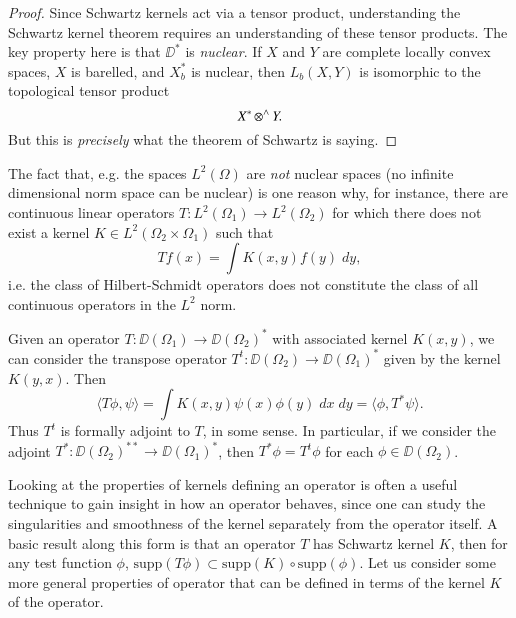 \begin{proof}
    Since Schwartz kernels act via a tensor product, understanding the Schwartz kernel theorem requires an understanding of these tensor products. The key property here is that $\DD^*$ is \emph{nuclear}. If $X$ and $Y$ are complete locally convex spaces, $X$ is barelled, and $X^*_b$ is nuclear, then $L_b(X,Y)$ is isomorphic to the topological tensor product
    \[ X^* \operatorname{{{\otimes}^\wedge}} Y. \]
    But this is \emph{precisely} what the theorem of Schwartz is saying.
\end{proof}

\begin{remark}
    The fact that, e.g. the spaces $L^2(\Omega)$ are \emph{not} nuclear spaces (no infinite dimensional norm space can be nuclear) is one reason why, for instance, there are continuous linear operators $T: L^2(\Omega_1) \to L^2(\Omega_2)$ for which there does not exist a kernel $K \in L^2(\Omega_2 \times \Omega_1)$ such that
    \[ Tf(x) = \int K(x,y) f(y)\; dy, \]
    i.e. the class of Hilbert-Schmidt operators does not constitute the class of all continuous operators in the $L^2$ norm.
\end{remark}

Given an operator $T: \DD(\Omega_1) \to \DD(\Omega_2)^*$ with associated kernel $K(x,y)$, we can consider the transpose operator $T^t: \DD(\Omega_2) \to \DD(\Omega_1)^*$ given by the kernel $K(y,x)$. Then
%
\[ \langle T\phi, \psi \rangle = \int K(x,y) \psi(x) \phi(y)\; dx\; dy = \langle \phi, T^* \psi \rangle. \]
%
Thus $T^t$ is formally adjoint to $T$, in some sense. In particular, if we consider the adjoint $T^*: \DD(\Omega_2)^{**} \to \DD(\Omega_1)^*$, then $T^* \phi = T^t \phi$ for each $\phi \in \DD(\Omega_2)$.

Looking at the properties of kernels defining an operator is often a useful technique to gain insight in how an operator behaves, since one can study the singularities and smoothness of the kernel separately from the operator itself. A basic result along this form is that an operator $T$ has Schwartz kernel $K$, then for any test function $\phi$, $\text{supp}(T\phi) \subset \text{supp}(K) \circ \text{supp}(\phi)$. Let us consider some more general properties of operator that can be defined in terms of the kernel $K$ of the operator.

